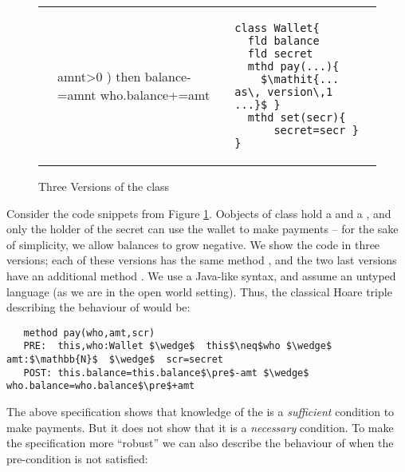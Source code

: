  \begin{figure}[htb]
 \begin{tabular}{lll} %
\begin{minipage}{0.45\textwidth}
\begin{lstlisting}
class Wallet{
  fld balance 
  fld secret 
  mthd pay(who,amt,scr){
    if ( (secret==scr)
       &amnt>0 ) then 
      balance-=amnt
      who.balance+=amt   }
 }
\end{lstlisting}
\end{minipage}
  & 
\begin{minipage}{0.45\textwidth}
\begin{lstlisting}
class Wallet{
  fld balance  
  fld secret  
  mthd pay(...){
    $\mathit{... as\, version\,1 ...}$ }
  mthd set(secr){
      secret=secr }
}
\end{lstlisting}
\end{minipage} 
 \end{tabular}
  \vspace*{-0.95cm}
  \caption{Three Versions of the class }
 \label{fig:ExampleWallet}
 \end{figure}

Consider the code snippets from Figure \ref{fig:ExampleWallet}. Oobjects of
 class   hold a  and a , and  only the holder of the secret can use the wallet to
 make payments
 -- for the sake of simplicity, we allow   balances to grow negative.
 We show the code in three versions; each of these versions has the same method , and the two last versions
 have an additional method .
  We use a Java-like syntax, and assume an untyped language (as we are in the open world setting).
 Thus, the classical Hoare triple describing the behaviour of  would be:
 
\begin{lstlisting}
   method pay(who,amt,scr)
   PRE:  this,who:Wallet $\wedge$  this$\neq$who $\wedge$ amt:$\mathbb{N}$  $\wedge$  scr=secret   
   POST: this.balance=this.balance$\pre$-amt $\wedge$ who.balance=who.balance$\pre$+amt 
 \end{lstlisting}
\vspace{-.2in}
The above specification shows that knowledge of the  is a \emph{sufficient} condition to make payments. 
But it does not show that it is a \emph{necessary} condition. To make the specification  
  more ``robust'' we can also describe the behaviour of     when the pre-condition is not satisfied:

